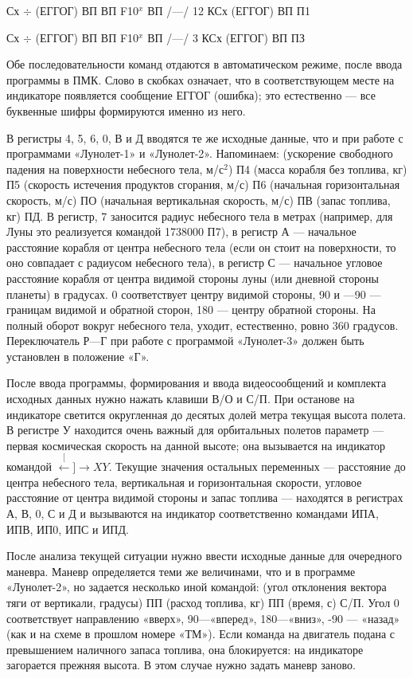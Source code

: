 \documentclass[11pt,a4paper,oneside]{article}
\def\XY{$\stackrel[\leftarrow]{\rightarrow}{XY}$}
\begin{document}
Сх $\div$ (ЕГГОГ) ВП ВП F10$^{x}$ ВП /—/ 12 КСх (ЕГГОГ) ВП П1

Сх $\div$ (ЕГГОГ) ВП ВП F10$^{x}$ ВП /—/ 3 КСх (ЕГГОГ) ВП ПЗ

Обе последовательности команд отдаются в автоматическом режиме, после ввода программы в ПМК. Слово в скобках означает, что в соответствующем месте на индикаторе появляется сообщение ЕГГОГ (ошибка); это естественно — все буквенные шифры формируются именно из него.

В регистры 4, 5, 6, 0, В и Д вводятся те же исходные данные, что и при работе с программами «Лунолет-1» и «Лунолет-2». Напоминаем: (ускорение свободного падения на поверхности небесного тела, м/с$^{2}$) П4 (масса корабля без топлива, кг) П5 (скорость истечения продуктов сгорания, м/с) П6 (начальная горизонтальная скорость, м/с) ПО (начальная вертикальная скорость, м/с) ПВ (запас топлива, кг) ПД. В регистр, 7 заносится радиус небесного тела в метрах (например, для Луны это реализуется командой 1738000 П7), в регистр А — начальное расстояние корабля от центра небесного тела (если он стоит на поверхности, то оно совпадает с радиусом небесного тела), в регистр С — начальное угловое расстояние корабля от центра видимой стороны луны (или дневной стороны планеты) в градусах. 0 соответствует центру видимой стороны, 90 и —90 — границам видимой и обратной сторон, 180 — центру обратной стороны. На полный оборот вокруг небесного тела, уходит, естественно, ровно 360 градусов. Переключатель Р—Г при работе с программой «Лунолет-3» должен быть установлен в положение «Г».

После ввода программы, формирования и ввода видеосообщений и комплекта исходных данных нужно нажать клавиши В/О и С/П. При останове на индикаторе светится округленная до десятых долей метра текущая высота полета. В регистре У находится очень важный для орбитальных полетов параметр — первая космическая скорость на данной высоте; она вызывается на индикатор командой \XY. Текущие значения остальных переменных — расстояние до центра небесного тела, вертикальная и горизонтальная скорости, угловое расстояние от центра видимой стороны и запас топлива — находятся в регистрах А, В, 0, С и Д и вызываются на индикатор соответственно командами ИПА, ИПВ, ИП0, ИПС и ИПД.

После анализа текущей ситуации нужно ввести исходные данные для очередного маневра. Маневр определяется теми же величинами, что и в программе «Лунолет-2», но задается несколько иной командой: (угол отклонения вектора тяги от вертикали, градусы) ПП (расход топлива, кг) ПП (время, с) С/П. Угол 0 соответствует направлению «вверх», 90—«вперед», 180—«вниз», -90 — «назад» (как и на схеме в прошлом номере «ТМ»). Если команда на двигатель подана с превышением наличного запаса топлива, она блокируется: на индикаторе загорается прежняя высота. В этом случае нужно задать маневр заново.
\end{document}
